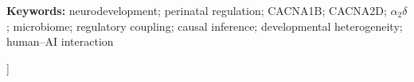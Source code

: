 \documentclass[10pt,letterpaper,twocolumn]{article}
\begin{document}
{\begin{center}
\begin{minipage}{.86\textwidth}
\vspace{.55em}
\noindent\textbf{Keywords:} neurodevelopment; perinatal regulation; CACNA1B; CACNA2D; \ensuremath{\alpha_2\delta}; microbiome; regulatory coupling; causal inference; developmental heterogeneity; human–AI interaction
\end{minipage}
\end{center}
\vspace{1em}
}]












\end{document}
